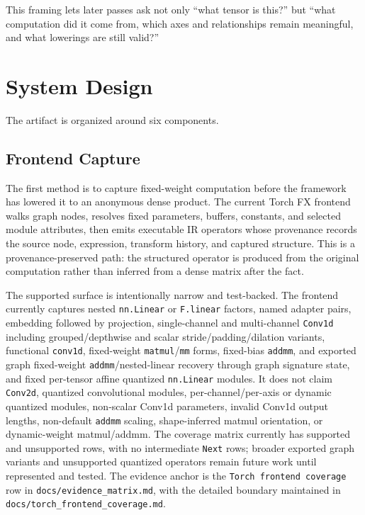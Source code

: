 \documentclass[11pt]{article}
\begin{document}
This framing lets later passes ask not only ``what tensor is this?'' but ``what
computation did it come from, which axes and relationships remain meaningful,
and what lowerings are still valid?''

\section{System Design}

The artifact is organized around six components.

\subsection{Frontend Capture}

The first method is to capture fixed-weight computation before the framework
has lowered it to an anonymous dense product. The current Torch FX frontend
walks graph nodes, resolves fixed parameters, buffers, constants, and selected
module attributes, then emits executable IR operators whose provenance records
the source node, expression, transform history, and captured structure. This is
a provenance-preserved path: the structured operator is produced from the
original computation rather than inferred from a dense matrix after the fact.

The supported surface is intentionally narrow and test-backed. The frontend
currently captures nested \texttt{nn.Linear} or \texttt{F.linear} factors,
named adapter pairs, embedding followed by projection, single-channel and
multi-channel \texttt{Conv1d} including grouped/depthwise and scalar
stride/padding/dilation variants, functional \texttt{conv1d}, fixed-weight
\texttt{matmul}/\texttt{mm} forms, fixed-bias \texttt{addmm}, and exported
graph fixed-weight \texttt{addmm}/nested-linear recovery through graph
signature state, and fixed per-tensor affine quantized \texttt{nn.Linear}
modules. It does not claim \texttt{Conv2d}, quantized convolutional modules,
per-channel/per-axis or dynamic quantized modules, non-scalar Conv1d
parameters, invalid Conv1d output lengths, non-default \texttt{addmm} scaling,
shape-inferred matmul orientation, or dynamic-weight matmul/addmm. The coverage
matrix currently has supported and unsupported rows, with no intermediate
\texttt{Next} rows; broader exported graph variants and unsupported quantized
operators remain future work until represented and tested. The evidence anchor
is the \texttt{Torch frontend coverage} row in
\texttt{docs/evidence\_matrix.md}, with the detailed boundary maintained in
\texttt{docs/torch\_frontend\_coverage.md}.
\end{document}
